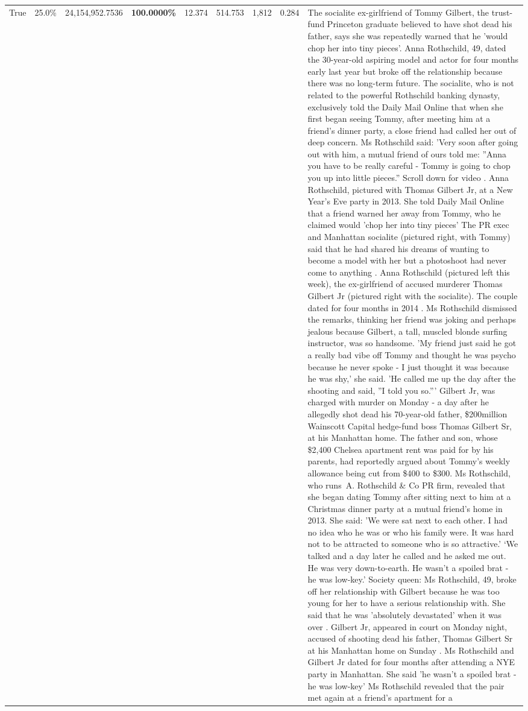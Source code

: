 \begin{table}[H]
\begin{tabular}{lllrlllll}
True & 25.0\% & 24,154,952.7536 & \bfseries \color{red} 100.0000\% & 12.374 & 514.753 & 1,812 & 0.284 & The socialite ex-girlfriend of Tommy Gilbert, the trust-fund Princeton graduate believed to have shot dead his father, says she was repeatedly warned that he 'would chop her into tiny pieces'. Anna Rothschild, 49, dated the 30-year-old aspiring model and actor for four months early last year but broke off the relationship because there was no long-term future. The socialite, who is not related to the powerful Rothschild banking dynasty, exclusively told the Daily Mail Online that when she first began seeing Tommy, after meeting him at a friend's dinner party, a close friend had called her out of deep concern. Ms Rothschild said: 'Very soon after going out with him, a mutual friend of ours told me: ''Anna you have to be really careful - Tommy is going to chop you up into little pieces.'' Scroll down for video . Anna Rothschild, pictured with Thomas Gilbert Jr, at a New Year's Eve party in 2013. She told Daily Mail Online that a friend warned her away from Tommy, who he claimed would 'chop her into tiny pieces' The PR exec and Manhattan socialite (pictured right, with Tommy) said that he had shared his dreams of wanting to become a model with her but a photoshoot had never come to anything . Anna Rothschild (pictured left this week), the ex-girlfriend of accused murderer Thomas Gilbert Jr (pictured right with the socialite). The couple dated for four months in 2014 . Ms Rothschild dismissed the remarks, thinking her friend was joking and perhaps jealous because Gilbert, a tall, muscled blonde surfing instructor, was so handsome. 'My friend just said he got a really bad vibe off Tommy and thought he was psycho because he never spoke - I just thought it was because he was shy,' she said. 'He called me up the day after the shooting and said, ''I told you so.''' Gilbert Jr, was charged with murder on Monday - a day after he allegedly shot dead his 70-year-old father, \$200million Wainscott Capital hedge-fund boss Thomas Gilbert Sr, at his Manhattan home. The father and son, whose \$2,400 Chelsea apartment rent was paid for by his parents, had reportedly argued about Tommy's weekly allowance being cut from \$400 to \$300. Ms Rothschild, who runs A. Rothschild \& Co PR firm, revealed that she began dating Tommy after sitting next to him at a Christmas dinner party at a mutual friend's home in 2013. She said: 'We were sat next to each other. I had no idea who he was or who his family were. It was hard not to be attracted to someone who is so attractive.' ‘We talked and a day later he called and he asked me out. He was very down-to-earth. He wasn’t a spoiled brat - he was low-key.’ Society queen: Ms Rothschild, 49, broke off her relationship with Gilbert because he was too young for her to have a serious relationship with. She said that he was 'absolutely devastated' when it was over . Gilbert Jr, appeared in court on Monday night, accused of shooting dead his father, Thomas Gilbert Sr at his Manhattan home on Sunday . Ms Rothschild and Gilbert Jr dated for four months after attending a NYE party in Manhattan. She said 'he wasn't a spoiled brat - he was low-key' Ms Rothschild revealed that the pair met again at a friend’s apartment for a 
\end{tabular}
\end{table}
